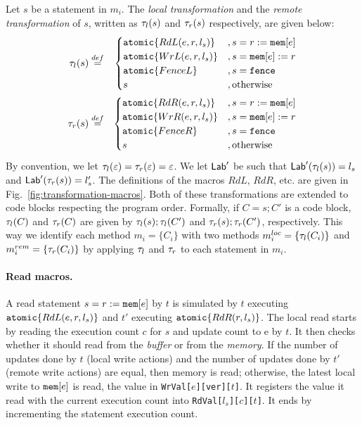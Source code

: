 Let $s$ be a statement in $m_i$.
The {\em local transformation} and the {\em remote transformation} of $s$, written as $\tau_{l}(s)$ and $\tau_{r}(s)$ respectively, are given below:
\begin{eqnarray*}
 \tau_{l}(s)  & \stackrel{def}{=} &
  \begin{cases}
   \mathtt{atomic}\{RdL(e,r,l_s)\} & , s=r:=\mathtt{mem}[e]\\
   \mathtt{atomic}\{WrL(e,r,l_s)\} & , s=\mathtt{mem}[e]:= r\\
   \mathtt{atomic}\{FenceL\} & , s=\mathtt{fence}\\
   s & , \textnormal{otherwise}
  \end{cases}\\
 \tau_{r}(s) & \stackrel{def}{=} &
  \begin{cases}
   \mathtt{atomic}\{RdR(e,r,l_s)\} & , s=r:=\mathtt{mem}[e]\\
   \mathtt{atomic}\{WrR(e,r,l_s)\} & , s=\mathtt{mem}[e]:= r\\
   \mathtt{atomic}\{FenceR\} & , s=\mathtt{fence}\\
   s & , \textnormal{otherwise}
  \end{cases}
\end{eqnarray*}
By convention, we let $\tau_{l}(\varepsilon)=\tau_{r}(\varepsilon)=\varepsilon$.
We let $\mathsf{Lab}'$ be such that $\mathsf{Lab}'(\tau_{l}(s))=l_s$ and $\mathsf{Lab}'(\tau_{r}(s))=l_s'$.
The definitions of the macros $RdL$, $RdR$, etc. are given in Fig.~\ref{fig:transformation-macros}.
Both of these transformations are extended to code blocks respecting the program order.
Formally, if $C=s;C'$ is a code block, $\tau_{l}(C)$ and $\tau_{r}(C)$ are given by $\tau_{l}(s); \tau_{l}(C')$ and $\tau_{r}(s); \tau_{r}(C')$, respectively.
This way we identify each method $m_i=\{C_i\}$ with two methods $m^{loc}_i=\{\tau_{l}(C_i)\}$ and $m^{rem}_i=\{\tau_{r}(C_i)\}$ by applying $\tau_{l}$ and $\tau_{r}$ to each statement in $m_i$.




\paragraph{Read macros.}
A read statement $s=r:=\mathtt{mem}[e]$ by $t$ is simulated by $t$ executing $\mathtt{atomic}\{RdL(e,r,l_s)\}$ and $t'$ executing $\mathtt{atomic}\{RdR(r,l_s)\}$.
The local read starts by reading the execution count $c$ for $s$ and update count to {\alimemx e} by $t$.
It then checks whether it should read from the {\em buffer} or from the {\em memory}.
If the number of updates done by $t$ (local write actions) and the number of updates done by $t'$ (remote write actions) are equal, then memory is read; otherwise, the latest local write to $\mathtt{mem}[e]$ is read, the value in {\tt WrVal[$e$][ver][$t$]}.
It registers the value it read with the current execution count into {\tt RdVal[$l_s$][$c$][$t$]}.
It ends by incrementing the statement execution count.

